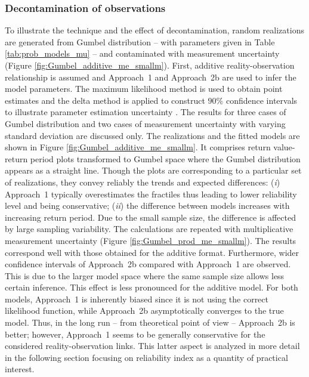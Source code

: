 \subsubsection{Decontamination of observations}
To illustrate the technique and the effect of decontamination, random realizations are generated from Gumbel distribution -- with parameters given in Table \ref{tab:prob_models_mu} -- and contaminated with measurement uncertainty (Figure \ref{fig:Gumbel_additive_me_smallm}). First, additive reality-observation relationship is assumed and Approach~1 and Approach~2b are used to infer the model parameters. The maximum likelihood method is used to obtain point estimates and the delta method is applied to construct $90\%$ confidence intervals to illustrate parameter estimation uncertainty \citep{Coles2001}. The results for three cases of Gumbel distribution and two cases of measurement uncertainty with varying standard deviation are discussed only. The realizations and the fitted models are shown in Figure \ref{fig:Gumbel_additive_me_smallm}. It comprises return value-return period plots transformed to Gumbel space where the Gumbel distribution appears as a straight line. Though the plots are corresponding to a particular set of realizations, they convey reliably the trends and expected differences: (\textit{i}) Approach~1 typically overestimates the fractiles thus leading to lower reliability level and being conservative; (\textit{ii}) the difference between models increases with increasing return period. Due to the small sample size, the difference is affected by large sampling variability.
The calculations are repeated with multiplicative measurement uncertainty (Figure \ref{fig:Gumbel_prod_me_smallm}). The results correspond well with those obtained for the additive format. Furthermore, wider confidence intervals of Approach~2b compared with Approach~1 are observed. This is due to the larger model space where the same sample size allows less certain inference. This effect is less pronounced for the additive model.
For both models, Approach~1 is inherently biased since it is not using the correct likelihood function, while Approach~2b asymptotically converges to the true model. Thus, in the long run -- from theoretical point of view -- Approach~2b is better; however, Approach~1 seems to be generally conservative for the considered reality-observation links. This latter aspect is analyzed in more detail in the following section focusing on reliability index as a quantity of practical interest.
